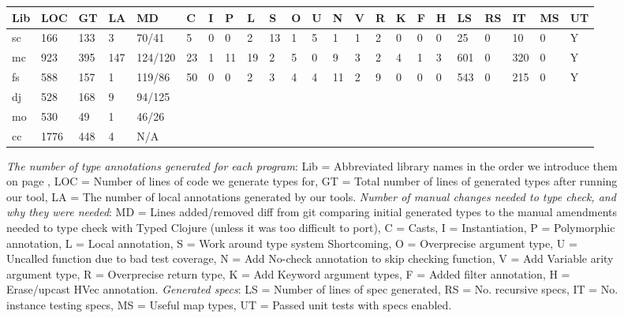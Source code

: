 \begin{figure*}
  \footnotesize
\begin{tabular}
{|         l   || l   | l  | l   || l  | l | l | l | l | l | l | l | l | l | l | l | l | l || l  | l  | l  | l | l |}
  Lib           & LOC  & GT  & LA & MD      & C  & I & P & L & S & O & U & N & V & R & K & F & H & LS & RS & IT & MS & UT\\ 
  \hline
  \hline
  sc            & 166  & 133 & 3  & 70/41   & 5  & 0 & 0 & 2 & 13& 1 & 5 & 1 & 1 & 2 & 0 & 0 & 0 & 25  & 0  & 10   & 0  & Y\\
  mc            & 923  & 395 & 147& 124/120 & 23 & 1 & 11& 19& 2 & 5 & 0 & 9 & 3 & 2 & 4 & 1 & 3 & 601 & 0  & 320  & 0  & Y\\
  fs            & 588  & 157 & 1  & 119/86  & 50 & 0 & 0 & 2 & 3 & 4 & 4 & 11& 2 & 9 & 0 & 0 & 0 & 543 & 0  & 215  & 0  & Y\\
  dj            & 528  & 168 & 9  & 94/125 \\
  mo            & 530  & 49  & 1  & 46/26\\
  cc            & 1776 & 448 & 4  & N/A 
  \\
\end{tabular}
  \caption{\emph{The number of type annotations generated for each program}:
  Lib = Abbreviated library names in the order we introduce them on page \pageref{infer:chap:evaluation},
  LOC = Number of lines of code we generate types for,
  GT = Total number of lines of generated types after running our tool,
  LA = The number of local annotations generated by our tools.
  \emph{Number of manual changes needed to type check, and why they were needed}:
  MD = Lines added/removed diff from git comparing initial generated types to
       the manual amendments needed to
       type check with Typed Clojure (unless it was too difficult to port),
  C = Casts,
  I = Instantiation,
  P = Polymorphic annotation,
  L = Local annotation,
  S = Work around type system Shortcoming,
  O = Overprecise argument type,
  U = Uncalled function due to bad test coverage,
  N = Add No-check annotation to skip checking function,
  V = Add Variable arity argument type,
  R = Overprecise return type,
  K = Add Keyword argument types,
  F = Added filter annotation,
  H = Erase/upcast HVec annotation.
  \emph{Generated specs}:
  LS = Number of lines of spec generated,
  RS = No. recursive specs,
  IT = No. instance testing specs,
  MS = Useful map types,
  UT = Passed unit tests with specs enabled.
  }
  \label{infer:fig:gentype}
\end{figure*}

